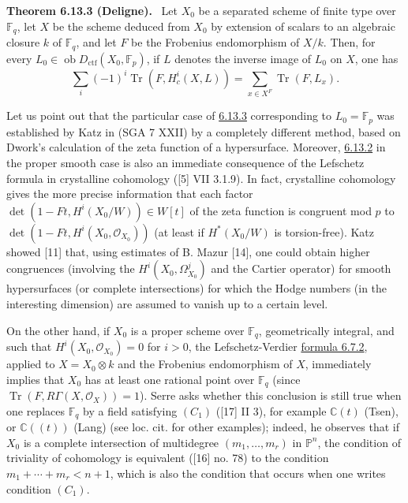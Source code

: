 \documentclass[11pt]{article}
\newenvironment{statement}[1]{\par\medskip\noindent\textbf{#1.}\ }{\par\medskip}
\newcommand{\ob}{\operatorname{ob}}
\providecommand{\ctf}{\mathrm{ctf}}
\providecommand{\OO}{\mathcal{O}}
\providecommand{\ob}{\operatorname{ob}}
\begin{document}
\label{sga5:III:theorem:6.13.3}\begin{statement}{Theorem 6.13.3 (Deligne)}
Let $X_0$ be a separated scheme of finite type over $\mathbb F_q$, let $X$ be the scheme deduced from $X_0$ by extension of scalars to an algebraic closure $k$ of $\mathbb F_q$, and let $F$ be the Frobenius endomorphism of $X/k$. Then, for every $L_0\in\ob D_{\ctf}(X_0,\mathbb F_p)$, if $L$ denotes the inverse image of $L_0$ on $X$, one has
\[
\sum_i(-1)^i\operatorname{Tr}(F,H_c^i(X,L))=
\sum_{x\in X^F}\operatorname{Tr}(F,L_x).
\]
\end{statement}

Let us point out that the particular case of \hyperref[sga5:III:theorem:6.13.3]{6.13.3} corresponding to $L_0=\mathbb F_p$ was established by Katz in (SGA 7 XXII) by a completely different method, based on Dwork's calculation of the zeta function of a hypersurface. Moreover, \hyperref[sga5:III:equation:6.13.2]{6.13.2} in the proper smooth case is also an immediate consequence of the Lefschetz formula in crystalline cohomology ([5] VII 3.1.9). In fact, crystalline cohomology gives the more precise information that each factor $\det(1-Ft,H^i(X_0/W))\in W[t]$ of the zeta function is congruent mod $p$ to $\det(1-Ft,H^i(X_0,\OO_{X_0}))$ (at least if $H^*(X_0/W)$ is torsion-free). Katz showed [11] that, using estimates of B. Mazur [14], one could obtain higher congruences (involving the $H^i(X_0,\Omega^j_{X_0})$ and the Cartier operator) for smooth hypersurfaces (or complete intersections) for which the Hodge numbers (in the interesting dimension) are assumed to vanish up to a certain level.

On the other hand, if $X_0$ is a proper scheme over $\mathbb F_q$, geometrically integral, and such that $H^i(X_0,\OO_{X_0})=0$ for $i>0$, the Lefschetz-Verdier \hyperref[sga5:III:equation:6.7.2]{formula 6.7.2}, applied to $X=X_0\otimes k$ and the Frobenius endomorphism of $X$, immediately implies that $X_0$ has at least one rational point over $\mathbb F_q$ (since $\operatorname{Tr}(F,R\Gamma(X,\OO_X))=1$). Serre asks whether this conclusion is still true when one replaces $\mathbb F_q$ by a field satisfying $(C_1)$ ([17] II 3), for example $\mathbb C(t)$ (Tsen), or $\mathbb C((t))$ (Lang) (see loc. cit. for other examples); indeed, he observes that if $X_0$ is a complete intersection of multidegree $(m_1,\ldots,m_r)$ in $\mathbb P^n$, the condition of triviality of cohomology is equivalent ([16] no. 78) to the condition $m_1+\cdots+m_r<n+1$, which is also the condition that occurs when one writes condition $(C_1)$.
\end{document}
